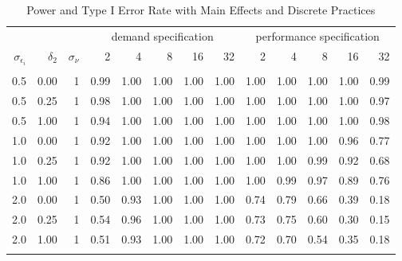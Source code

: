 \begin{table}

\caption{\label{tab:robustness-main-table}Power and Type I Error Rate with Main Effects and Discrete Practices}
\centering
\fontsize{8}{10}\selectfont
\begin{threeparttable}
\begin{tabular}[t]{rrrrrrrrrrrrr}
\toprule
\multicolumn{3}{c}{ } & \multicolumn{5}{c}{demand specification} & \multicolumn{5}{c}{performance specification} \\
\cmidrule(l{3pt}r{3pt}){4-8} \cmidrule(l{3pt}r{3pt}){9-13}
$\sigma_{\epsilon_i}$ & $\delta_2$ & $\sigma_{\nu}$ & 2 & 4 & 8 & 16 & 32 & 2 & 4 & 8 & 16 & 32\\
\midrule
\addlinespace[0.3em]
\multicolumn{13}{c}{\textbf{1 Discrete Practice - Power}}\\
\hspace{1em}0.5 & 0.00 & 1 & 0.99 & 1.00 & 1.00 & 1.00 & 1.00 & 1.00 & 1.00 & 1.00 & 1.00 & 0.99\\
\hspace{1em}0.5 & 0.25 & 1 & 0.98 & 1.00 & 1.00 & 1.00 & 1.00 & 1.00 & 1.00 & 1.00 & 1.00 & 0.97\\
\hspace{1em}0.5 & 1.00 & 1 & 0.94 & 1.00 & 1.00 & 1.00 & 1.00 & 1.00 & 1.00 & 1.00 & 1.00 & 0.98\\
\hspace{1em}1.0 & 0.00 & 1 & 0.92 & 1.00 & 1.00 & 1.00 & 1.00 & 1.00 & 1.00 & 1.00 & 0.96 & 0.77\\
\hspace{1em}1.0 & 0.25 & 1 & 0.92 & 1.00 & 1.00 & 1.00 & 1.00 & 1.00 & 1.00 & 0.99 & 0.92 & 0.68\\
\hspace{1em}1.0 & 1.00 & 1 & 0.86 & 1.00 & 1.00 & 1.00 & 1.00 & 1.00 & 0.99 & 0.97 & 0.89 & 0.76\\
\hspace{1em}2.0 & 0.00 & 1 & 0.50 & 0.93 & 1.00 & 1.00 & 1.00 & 0.74 & 0.79 & 0.66 & 0.39 & 0.18\\
\hspace{1em}2.0 & 0.25 & 1 & 0.54 & 0.96 & 1.00 & 1.00 & 1.00 & 0.73 & 0.75 & 0.60 & 0.30 & 0.15\\
\hspace{1em}2.0 & 1.00 & 1 & 0.51 & 0.93 & 1.00 & 1.00 & 1.00 & 0.72 & 0.70 & 0.54 & 0.35 & 0.18\\
\addlinespace[0.3em]
\multicolumn{13}{c}{\textbf{1 Discrete Practice - Type I}}\\

\end{tabular}
\end{threeparttable}
\end{table}
